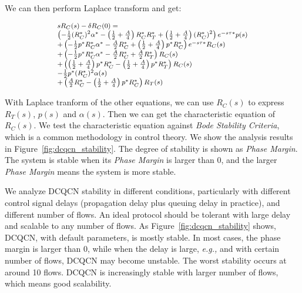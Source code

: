 We can then perform Laplace transform and get:

\begin{equation}
\small
\begin{array}{l}
s{R_C}(s) - \delta {R_C}(0) = \\
\left( { - \frac{1}{2}{{(R_C^*)}^2}{\alpha ^*} - \left( {\frac{1}{2} + \frac{A}{4}} \right)R_C^*R_T^* + \left( {\frac{1}{2} + \frac{A}{4}} \right){{(R_C^*)}^2}} \right){e^{ - s\tau *}}p(s)\\
 + \left( { - \frac{1}{2}{p^*}R_C^*{\alpha ^*} - \frac{A}{2}R_C^* + \left( {\frac{1}{2} + \frac{A}{4}} \right){p^*}R_C^*} \right){e^{ - s\tau *}}{R_C}(s)\\
 + \left( { - \frac{1}{2}{p^*}R_C^*{\alpha ^*} - \frac{A}{2}R_C^* + \frac{A}{2}R_T^* }\right){R_C}(s)\\
 + \left( { \left( {\frac{1}{2} + \frac{A}{4}} \right){p^*}R_C^* - \left( {\frac{1}{2} + \frac{A}{4}} \right){p^*}R_T^*} \right){R_C}(s)\\
 - \frac{1}{2}{p^*}{(R_C^*)^2}\alpha (s)\\
 + \left( {\frac{A}{2}R_C^* - \left( {\frac{1}{2} + \frac{A}{4}} \right){p^*}R_C^*} \right){R_T}(s)
\end{array}
\end{equation}

With Laplace tranform of the other equations, we can use ${R_C}(s)$ to express ${R_T}(s)$, $p(s)$ and $\alpha (s)$.
Then we can get the characteristic equation of ${R_C}(s)$. We test the characteristic equation against {\em Bode Stability
Criteria}, which is a common methodology in control theory. We show the analysis results in Figure~\ref{fig:dcqcn_stability}. 
The degree of stability is shown as {\em Phase Margin}. The system is stable when its {\em Phase Margin} is larger than 0, 
and the larger {\em Phase Margin} means the system is more stable.

We analyze DCQCN stability in different conditions, particularly with different control signal delays (propagation delay
plus queuing delay in practice), and different number of flows. An ideal protocol should be tolerant with large delay and
scalable to any number of flows. As Figure~\ref{fig:dcqcn_stability} shows, DCQCN, with default parameters, is mostly 
stable. In most cases, the phase margin is larger than 0, while when the delay is large, {\em e.g.,} and with certain 
number of flows, DCQCN may become unstable. The worst stability occurs at around 10 flows. DCQCN is increasingly stable 
with larger number of flows, which means good scalability.

